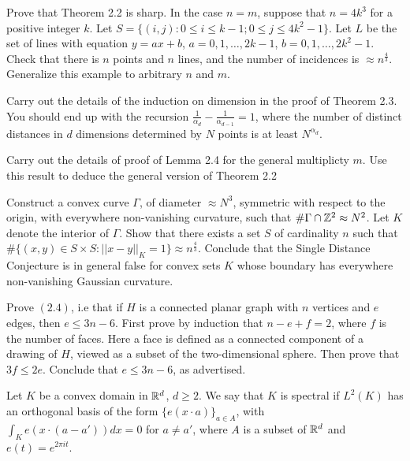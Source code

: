  Prove that Theorem 2.2 is sharp. In the
case $n=m$, suppose that $n=4k^3$ for a positive integer $k$. Let
$S=\{(i,j): 0 \leq i \leq k-1; 0 \leq j \leq 4k^2-1\}$. Let $L$ be
the set of lines with equation $y=ax+b$, $a=0,1, \dots, 2k-1$,
$b=0, 1, \dots, 2k^2-1$. Check that there is $n$ points and $n$
lines, and the number of incidences is $\approx n^{\frac{4}{3}}$.
Generalize this example to arbitrary $n$ and $m$. \endproclaim

 Carry out the details of the induction on
dimension in the proof of Theorem 2.3. You should end up with the
recursion $\frac{1}{\alpha_d}-\frac{1}{\alpha_{d-1}}=1$, where the
number of distinct distances in $d$ dimensions determined by $N$
points is at least $N^{\alpha_d}$. \endproclaim

 Carry out the details of proof of Lemma
2.4 for the general multiplicty $m$. Use this result to deduce the
general version of Theorem 2.2 \endproclaim

 Construct a convex curve $\Gamma$, of
diameter $\approx N^3$, symmetric with respect to the origin, with
everywhere non-vanishing curvature, such that $\# \Gamma \cap
{\Bbb Z}^2 \approx N^2$. Let $K$ denote the interior of $\Gamma$.
Show that there exists a set $S$ of cardinality $n$ such that $\#
\{(x,y) \in S \times S: {||x-y||}_K=1\} \approx n^{\frac{4}{3}}$.
Conclude that the Single Distance Conjecture is in general false
for convex sets $K$ whose boundary has everywhere non-vanishing
Gaussian curvature. \endproclaim

 Prove $(2.4)$, i.e that if $H$ is a
connected planar graph with $n$ vertices and $e$ edges, then $e
\leq 3n-6$. First prove by induction that $n-e+f=2$, where $f$ is
the number of faces. Here a face is defined as a connected
component of a drawing of $H$, viewed as a subset of the
two-dimensional sphere. Then prove that $3f \leq 2e$. Conclude
that $e \leq 3n-6$, as advertised. \endproclaim

 Let $K$ be a convex domain in ${\Bbb
R}^d$, $d \ge 2$. We say that $K$ is spectral if $L^2(K)$ has an
orthogonal basis of the form ${\{e(x \cdot a)\}}_{a \in A}$, with
$\int_K e(x \cdot (a-a')) dx=0$ for $a \not=a'$, where $A$ is a
subset of ${\Bbb R}^d$ and $e(t)=e^{2 \pi it}$.

